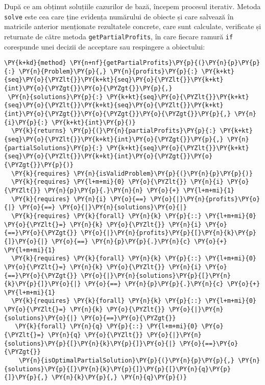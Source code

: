 \begin{sloppypar}
    \par După ce am obținut soluțiile cazurilor de bază, începem procesul iterativ. Metoda \texttt{solve} este cea care ține evidența numărului de obiecte și care salvează în matricile anterior menționate rezultatele concrete, care sunt calculate, verificate și returnate de către metoda \texttt{getPartialProfits}, în care fiecare ramură \texttt{if} corespunde unei decizii de acceptare sau respingere a obiectului:
    \begin{Verbatim}[commandchars=\\\{\}]
\PY{k+kd}{method} \PY{n+nf}{getPartialProfits}\PY{p}{(}\PY{n}{p}\PY{p}{:} \PY{n}{Problem}\PY{p}{,} \PY{n}{profits}\PY{p}{:} \PY{k+kt}{seq}\PY{o}{\PYZlt{}}\PY{k+kt}{seq}\PY{o}{\PYZlt{}}\PY{k+kt}{int}\PY{o}{\PYZgt{}}\PY{o}{\PYZgt{}}\PY{p}{,} 
 \PY{n}{solutions}\PY{p}{:} \PY{k+kt}{seq}\PY{o}{\PYZlt{}}\PY{k+kt}{seq}\PY{o}{\PYZlt{}}\PY{k+kt}{seq}\PY{o}{\PYZlt{}}\PY{k+kt}{int}\PY{o}{\PYZgt{}}\PY{o}{\PYZgt{}}\PY{o}{\PYZgt{}}\PY{p}{,} \PY{n}{i}\PY{p}{:} \PY{k+kt}{int}\PY{p}{)} 
  \PY{k}{returns} \PY{p}{(}\PY{n}{partialProfits}\PY{p}{:} \PY{k+kt}{seq}\PY{o}{\PYZlt{}}\PY{k+kt}{int}\PY{o}{\PYZgt{}}\PY{p}{,} \PY{n}{partialSolutions}\PY{p}{:} \PY{k+kt}{seq}\PY{o}{\PYZlt{}}\PY{k+kt}{seq}\PY{o}{\PYZlt{}}\PY{k+kt}{int}\PY{o}{\PYZgt{}}\PY{o}{\PYZgt{}}\PY{p}{)}
  \PY{k}{requires} \PY{n}{isValidProblem}\PY{p}{(}\PY{n}{p}\PY{p}{)}
  \PY{k}{requires} \PY{l+m+mi}{0} \PY{o}{\PYZlt{}} \PY{n}{i} \PY{o}{\PYZlt{}} \PY{n}{p}\PY{p}{.}\PY{n}{n} \PY{o}{+} \PY{l+m+mi}{1}
  \PY{k}{requires} \PY{n}{i} \PY{o}{==} \PY{o}{|}\PY{n}{profits}\PY{o}{|} \PY{o}{==} \PY{o}{|}\PY{n}{solutions}\PY{o}{|}
  \PY{k}{requires} \PY{k}{forall} \PY{n}{k} \PY{p}{::} \PY{l+m+mi}{0} \PY{o}{\PYZlt{}=} \PY{n}{k} \PY{o}{\PYZlt{}} \PY{n}{i} \PY{o}{==}\PY{o}{\PYZgt{}} \PY{o}{|}\PY{n}{profits}\PY{p}{[}\PY{n}{k}\PY{p}{]}\PY{o}{|} \PY{o}{==} \PY{n}{p}\PY{p}{.}\PY{n}{c} \PY{o}{+} \PY{l+m+mi}{1}
  \PY{k}{requires} \PY{k}{forall} \PY{n}{k} \PY{p}{::} \PY{l+m+mi}{0} \PY{o}{\PYZlt{}=} \PY{n}{k} \PY{o}{\PYZlt{}} \PY{n}{i} \PY{o}{==}\PY{o}{\PYZgt{}} \PY{o}{|}\PY{n}{solutions}\PY{p}{[}\PY{n}{k}\PY{p}{]}\PY{o}{|} \PY{o}{==} \PY{n}{p}\PY{p}{.}\PY{n}{c} \PY{o}{+} \PY{l+m+mi}{1}
  \PY{k}{requires} \PY{k}{forall} \PY{n}{k} \PY{p}{::} \PY{l+m+mi}{0} \PY{o}{\PYZlt{}=} \PY{n}{k} \PY{o}{\PYZlt{}} \PY{o}{|}\PY{n}{solutions}\PY{o}{|} \PY{o}{==}\PY{o}{\PYZgt{}} 
   \PY{k}{forall} \PY{n}{q} \PY{p}{::} \PY{l+m+mi}{0} \PY{o}{\PYZlt{}=} \PY{n}{q} \PY{o}{\PYZlt{}} \PY{o}{|}\PY{n}{solutions}\PY{p}{[}\PY{n}{k}\PY{p}{]}\PY{o}{|} \PY{o}{==}\PY{o}{\PYZgt{}} 
    \PY{n}{isOptimalPartialSolution}\PY{p}{(}\PY{n}{p}\PY{p}{,} \PY{n}{solutions}\PY{p}{[}\PY{n}{k}\PY{p}{]}\PY{p}{[}\PY{n}{q}\PY{p}{]}\PY{p}{,} \PY{n}{k}\PY{p}{,} \PY{n}{q}\PY{p}{)} 

\end{Verbatim}
\end{sloppypar}
